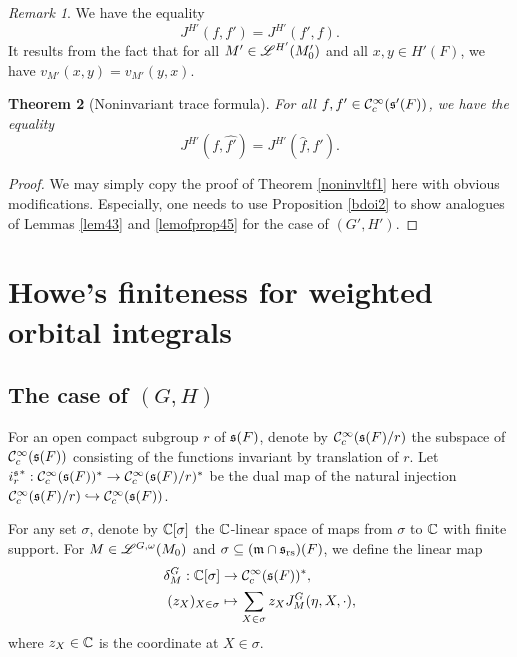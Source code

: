 \documentclass[a4paper]{amsart}
\newcommand{\fm}{{\mathfrak{m}}} \newcommand{\fn}{{\mathfrak{n}}}\newcommand{\fo}{{\mathfrak{o}}} \newcommand{\fp}{{\mathfrak{p}}}
\newtheorem{thm}{Theorem}[section]
\theoremstyle{definition}
\theoremstyle{remark}
\newtheorem{remark}[thm]{Remark}
\numberwithin{equation}{subsection}
\begin{document}
\begin{remark}\label{rmkV.1.2}
We have the equality
$$ J^{H'}(f, f')=J^{H'}(f', f). $$
It results from the fact that for all $M'\in\mathscr{L}^{H'}(M'_0)$ and all $x,y\in H'(F)$, we have $v_{M'}(x,y)=v_{M'}(y,x)$. 
\end{remark}

\begin{thm}[Noninvariant trace formula]\label{noninvltf2}
For all $f, f'\in{\mathcal {C}}_c^\infty({\mathfrak{s}}'(F))$, we have the equality
$$ J^{H'}(f, \hat{f'})=J^{H'}(\hat{f}, f'). $$
\end{thm}

\begin{proof}
We may simply copy the proof of Theorem \ref{noninvltf1} here with obvious modifications. Especially, one needs to use Proposition \ref{bdoi2} to show analogues of Lemmas \ref{lem43} and \ref{lemofprop45} for the case of $(G',H')$. 
\end{proof}




\section{\textbf{Howe's finiteness for weighted orbital integrals}}\label{sechowfin}

\subsection{The case of $(G,H)$}

For an open compact subgroup $r$ of ${\mathfrak{s}}(F)$, denote by ${\mathcal {C}}_c^\infty({\mathfrak{s}}(F)/r)$ the subspace of ${\mathcal {C}}_c^\infty({\mathfrak{s}}(F))$ consisting of the functions invariant by translation of $r$. Let ${i_r^{\mathfrak{s}}}^*: {\mathcal {C}}_c^\infty({\mathfrak{s}}(F))^*\rightarrow{\mathcal {C}}_c^\infty({\mathfrak{s}}(F)/r)^*$ be the dual map of the natural injection ${\mathcal {C}}_c^\infty({\mathfrak{s}}(F)/r)\hookrightarrow{\mathcal {C}}_c^\infty({\mathfrak{s}}(F))$. 

For any set $\sigma$, denote by ${\mathbb {C}}[\sigma]$ the ${\mathbb {C}}$-linear space of maps from $\sigma$ to ${\mathbb {C}}$ with finite support. For $M\in\mathscr{L}^{G,\omega}(M_0)$ and $\sigma\subseteq (\fm\cap\fs_\rs)(F)$, we define the linear map
\[\begin{split}
\delta_M^G: {\mathbb {C}}[\sigma] &\rightarrow {\mathcal {C}}_c^\infty({\mathfrak{s}}(F))^*, \\
(z_X)_{X\in\sigma} &\mapsto \sum_{X\in\sigma} z_X J_M^G(\eta, X, \cdot), \\
\end{split}\]
where $z_X\in{\mathbb {C}}$ is the coordinate at $X\in\sigma$. 
\end{document}
